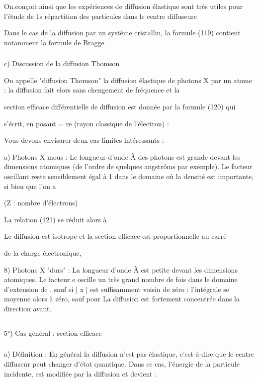 On.conçoit ainsi que les expériences de diffusion élastique sont
très utiles pour l'étude de 1s répartition des particules dans le centre diffuseure

Dans le cas de la diffusion par un système cristallin, la formule
(119) contient notamment la formule de Bragge
\subsubsection{}%
c) Discussion de la diffusion Thomson

On appelle "diffusion Thomson" la diffusion élastique de photons X
par un atome : la diffusion  fait elors sans chengement de fréquence et la

section efficace différentielle de diffusion est donnée par la formule (120) qui

s'écrit, en posant = re (rayon classique de l'électron) :

% 
Vous devons envisarer deux cas limites intéressants :

a) Photons X mous : Le longueur d'onde À des photons est
grande devant les dimensions atomiques (de l'ordre de quelques angstrôms
par exemple). Le facteur oscillant  reste sensiblement égal à 1 dans
le domaine où la densité est importante, si bien que l'on a

 (Z : nombre d'électrons)

La relation (121) se réduit alors à

Le diffusion est isotrope et la section efficace est proportionnelle au carré

de la charge électronique,

8) Photons X "durs" : La longueur d'onde À est petite devant les
dimensions atomiques. Le facteur e oscille un très grand nombre de fois
dans le domaine d'extension de , sauf si | x | est suffisamment voisin
de zéro : l'intégrale  se moyenne alors à zéro, sauf pour
La diffusion est fortement concentrée dans la direction avant.

\subsection{}%
5°) Cas général : section efficace
\subsubsection{}%
a) Définition :
En général la diffusion n'est pas élastique, c'est-à-dire que le
centre diffuseur peut changer d'état quantique. Dans ce cas, l'énergie de la
particule incidente,  est modifiée par la diffusion et devient :

